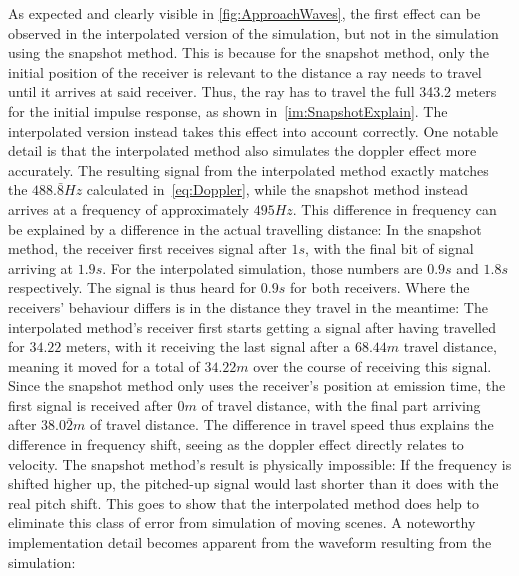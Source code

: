 As expected and clearly visible in \autoref{fig:ApproachWaves}, the first effect can be observed in the interpolated version of the simulation,
but not in the simulation using the snapshot method.
This is because for the snapshot method,
only the initial position of the receiver is relevant to the distance a ray needs to travel until it arrives at said receiver.
Thus, the ray has to travel the full 343.2 meters for the initial impulse response, as shown in~\autoref{im:SnapshotExplain}.
The interpolated version instead takes this effect into account correctly.
\newline
One notable detail is that the interpolated method also simulates the doppler effect more accurately.
The resulting signal from the interpolated method exactly matches the \(488.\bar{8} Hz\) calculated in~\eqref{eq:Doppler},
while the snapshot method instead arrives at a frequency of approximately \(495 Hz\).
\newline
This difference in frequency can be explained by a difference in the actual travelling distance:
In the snapshot method, the receiver first receives signal after \(1s\),
with the final bit of signal arriving at \(1.9s\).
For the interpolated simulation, those numbers are \(0.9s\) and \(1.8s\) respectively.
The signal is thus heard for \(0.9s\) for both receivers.
\newline
Where the receivers' behaviour differs is in the distance they travel in the meantime:
The interpolated method's receiver first starts getting a signal after having travelled for \(34.22\) meters,
with it receiving the last signal after a \(68.44m\) travel distance,
meaning it moved for a total of \(34.22m\) over the course of receiving this signal.
Since the snapshot method only uses the receiver's position at emission time,
the first signal is received after \(0m\) of travel distance,
with the final part arriving after \(38.0\bar{2}m\) of travel distance.
\newline
The difference in travel speed thus explains the difference in frequency shift,
seeing as the doppler effect directly relates to velocity.
The snapshot method's result is physically impossible:
If the frequency is shifted higher up,
the pitched-up signal would last shorter than it does with the real pitch shift.
\newline
This goes to show that the interpolated method does help to eliminate this class of error from simulation of moving scenes.
\newline
A noteworthy implementation detail becomes apparent from the waveform resulting from the simulation:
